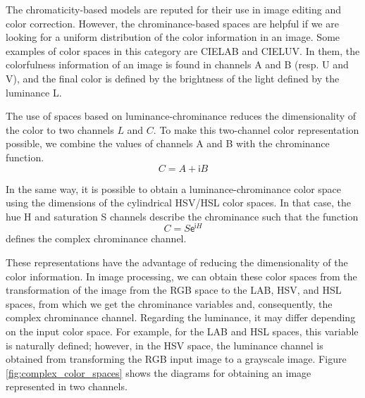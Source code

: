 The chromaticity-based models are reputed for their use in image editing and color correction. However, the chrominance-based spaces are helpful if we are looking for a uniform distribution of the color information in an image. Some examples of color spaces in this category are CIELAB and CIELUV. In them, the colorfulness information of an image is found in channels A and B (resp. U and V), and the final color is defined by the brightness of the light defined by the luminance L.

The use of spaces based on luminance-chrominance reduces the dimensionality of the color to two channels $L$ and $C$. To make this two-channel color representation possible, we combine the values of channels A and B with the chrominance function.
\begin{equation}\label{eq:chrominance_lab}
    C = A + \mathsf{i}B
\end{equation}

In the same way, it is possible to obtain a luminance-chrominance color space using the dimensions of the cylindrical HSV/HSL color spaces. In that case, the hue H and saturation S channels describe the chrominance such that the function
\begin{equation}\label{eq:chrominance_hsv}
    C = S \mathsf{e}^{\mathsf{i}H}
\end{equation}
defines the complex chrominance channel.

These representations have the advantage of reducing the dimensionality of the color information. In image processing, we can obtain these color spaces from the transformation of the image from the RGB space to the LAB, HSV, and HSL spaces, from which we get the chrominance variables and, consequently, the complex chrominance channel. Regarding the luminance, it may differ depending on the input color space. For example, for the LAB and HSL spaces, this variable is naturally defined; however, in the HSV space, the luminance channel is obtained from transforming the RGB input image to a grayscale image. Figure \ref{fig:complex_color_spaces} shows the diagrams for obtaining an image represented in two channels.

